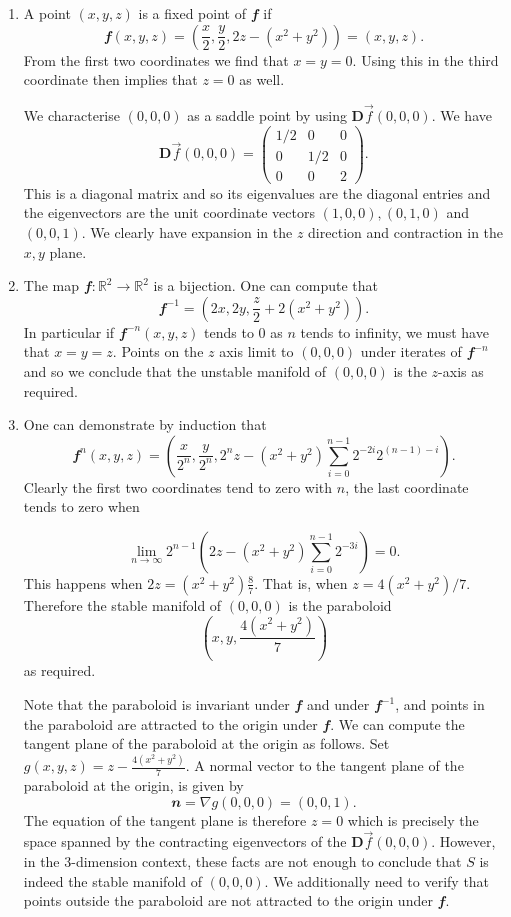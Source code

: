 \documentclass[
  a4paper,
  oneside,
  final]{krantz}
\newcommand{\R}{\mathbb{R}}
\renewcommand{\v}[1]{{\mathbfit{#1}}}
\newcommand{\jacob}{{\mathbf{D}}\vec{f}}
\theoremstyle{definition}
\theoremstyle{definition}
\theoremstyle{definition}
\theoremstyle{definition}
\theoremstyle{remark}
\begin{document}
\begin{enumerate}
\def\labelenumi{\alph{enumi}.}
\item
  A point \((x,y,z)\) is a fixed point of \(\v{f}\) if
  \[\v{f}(x,y,z) = \left( \frac{x}{2}, \frac{y}{2}, 2z - (x^2 + y^2) \right) = (x,y,z).\]
  From the first two coordinates we find that \(x = y = 0\). Using this in the third coordinate then implies that \(z =0\) as well.

  We characterise \((0,0,0)\) as a saddle point by using \(\jacob(0,0,0)\). We have
  \[
       \jacob(0,0,0) = \begin{pmatrix} 1/2 & 0 & 0 \\ 0 & 1/2 & 0 \\ 0 & 0 & 2 \end{pmatrix}.
   \]
  This is a diagonal matrix and so its eigenvalues are the diagonal entries and the eigenvectors are the unit coordinate vectors \((1,0,0), (0,1,0)\) and \((0,0,1)\). We clearly have expansion in the \(z\) direction and contraction in the \(x,y\) plane.
\item
  The map \(\v{f}: \R^2 \to \R^2\) is a bijection. One can compute that
  \[
      \v{f}^{-1} = (2x,2y, \frac{z}{2} + 2(x^2 + y^2)).
  \]
  In particular if \(\v{f}^{-n}(x,y,z)\) tends to \(0\) as \(n\) tends to infinity, we must have that \(x = y = z\). Points on the \(z\) axis limit to \((0,0,0)\) under iterates of \(\v{f}^{-n}\) and so we conclude that the unstable manifold of \((0,0,0)\) is the \(z\)-axis as required.
\item
  One can demonstrate by induction that
  \[
   \v{f}^{n}(x,y,z) = \left(\frac{x}{2^n}, \frac{y}{2^n}, 2^{n}z - (x^2 +y^2) \sum_{i=0}^{n-1} 2^{-2i}2^{(n-1) - i}\right).
  \]
  Clearly the first two coordinates tend to zero with \(n\), the last coordinate tends to zero when

  \[
  \lim_{n \to \infty} 2^{n-1}\left( 2 z -(x^2 + y^2) \sum_{i=0}^{n-1} 2^{-3i}\right) = 0.
  \]
  This happens when \(2z = (x^2 + y^2) \frac{8}{7}\). That is, when \(z = 4(x^2 + y^2)/7\).
  Therefore the stable manifold of \((0,0,0)\) is the paraboloid
  \[\left(x,y, \frac{4(x^2 + y^2)}{7} \right)\]
  as required.

  Note that the paraboloid is invariant under \(\v{f}\) and under \(\v{f}^{-1}\), and points in the paraboloid are attracted to the origin under \(\v{f}\). We can compute the tangent plane of the paraboloid at the origin as follows. Set \(g(x,y,z) = z - \frac{4(x^2 + y^2)}{7}\). A normal vector to the tangent plane of the paraboloid at the origin, is given by
  \[ \v{n} = \nabla g(0,0,0) = (0,0,1).
  \]
  The equation of the tangent plane is therefore \(z = 0\) which is precisely the space spanned by the contracting eigenvectors of the \(\jacob(0,0,0)\). However, in the 3-dimension context, these facts are not enough to conclude that \(S\) is indeed the stable manifold of \((0,0,0)\). We additionally need to verify that points outside the paraboloid are not attracted to the origin under \(\v{f}\).


\end{enumerate}
\end{document}
